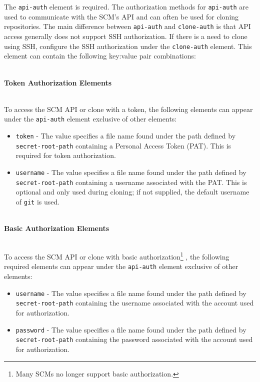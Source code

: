 \noindent\\\\The \texttt{api-auth} element is required.  The authorization methods for \texttt{api-auth} 
are used to communicate with the SCM's API and can often be used for cloning repositories.  The
main difference between \texttt{api-auth} and \texttt{clone-auth} is that API access generally
does not support SSH authorization. If there is a need to clone using SSH, configure the SSH
authorization under the \texttt{clone-auth} element.  This element can contain the following
key:value pair combinations:

\noindent\\\textbf{Token Authorization Elements}

\noindent\\To access the SCM API or clone with a token, the following elements can appear under the 
\texttt{api-auth} element exclusive of other elements:

\begin{itemize}
    \item \texttt{token} - The value specifies a file name found under the path defined
    by \texttt{secret-root-path} containing a Personal Access Token (PAT).  This is required for
    token authorization.
    \item \texttt{username} - The value specifies a file name found under the path defined
    by \texttt{secret-root-path} containing a username associated with the PAT.  This is 
    optional and only used during cloning; if not supplied, the default username of \texttt{git} is used.
\end{itemize}

\noindent\\\textbf{Basic Authorization Elements}

\noindent\\To access the SCM API or clone with basic authorization\footnote{Many SCMs no longer support basic authorization.}
, the following required elements can
appear under the \texttt{api-auth} element exclusive of other elements:

\begin{itemize}
    \item \texttt{username} - The value specifies a file name found under the path defined
    by \texttt{secret-root-path} containing the username associated with the account used
    for authorization. 
    \item \texttt{password} - The value specifies a file name found under the path defined
    by \texttt{secret-root-path} containing the password associated with the account used
    for authorization. 
\end{itemize}

